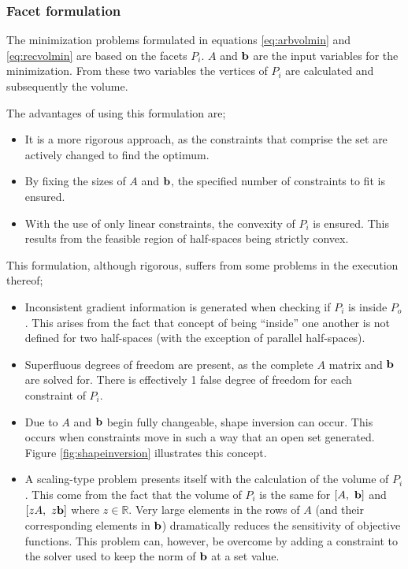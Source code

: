 \subsubsection{Facet formulation}
The minimization problems formulated in equations \ref{eq:arbvolmin} and \ref{eq:recvolmin} are based on the facets $P_i$.
$A$ and ${\bf {b}}$ are the input variables for the minimization.
From these two variables the vertices of $P_i$ are calculated and subsequently the volume.

The advantages of using this formulation are;
\begin{itemize}
\item It is a more rigorous approach, as the constraints that comprise the set are actively changed to find the optimum.
\item By fixing the sizes of $A$ and ${\bf {b}}$, the specified number of constraints to fit is ensured.
\item With the use of only linear constraints, the convexity of $P_i$ is ensured.
This results from the feasible region of half-spaces being strictly convex.
\end{itemize}

This formulation, although rigorous, suffers from some problems in the execution thereof;
\begin{itemize}
\item Inconsistent gradient information is generated when checking if $P_i$ is inside $P_o$.
This arises from the fact that concept of being ``inside'' one another is not defined for two half-spaces (with the exception of parallel half-spaces).
\item Superfluous degrees of freedom are present, as the complete $A$ matrix and ${\bf {b}}$ are solved for.
There is effectively 1 false degree of freedom for each constraint of $P_i$.
\item Due to $A$ and ${\bf {b}}$ begin fully changeable, shape inversion can occur.
This occurs when constraints move in such a way that an open set generated.
Figure \ref{fig:shapeinversion} illustrates this concept.
\item A scaling-type problem presents itself with the calculation of the volume of $P_i$.
This come from the fact that the volume of $P_i$ is the same for $[A,~ {\bf {b}}]$ and $[zA,~z{\bf {b}}]$ where $z\in \mathbb{R}$.
Very large elements in the rows of $A$ (and their corresponding elements in ${\bf {b}}$) dramatically reduces the sensitivity of objective functions.
This problem can, however, be overcome by adding a constraint to the solver used to keep the norm of ${\bf {b}}$ at a set value.
\end{itemize}

